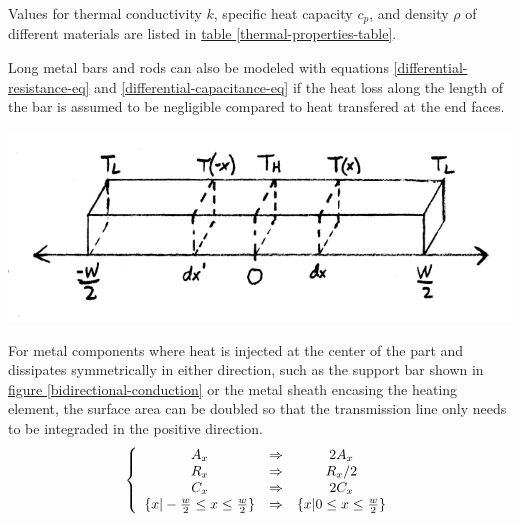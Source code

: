 \documentclass[10pt, twocolumn]{article}
\begin{document}
Values for thermal conductivity $k$, specific heat capacity $c_{p}$, and 
density $\rho$ of different materials are listed in
\hyperref[thermal-properties-table]{table \ref{thermal-properties-table}}.

Long metal bars and rods can also be modeled with equations
\ref{differential-resistance-eq} and \ref{differential-capacitance-eq}
if the heat loss along the length of the bar is assumed to be
negligible compared to heat transfered at the end faces.

\begin{center}
	\includegraphics[width=1\columnwidth]{Figures/bidirectional-conduction.pdf}
	\label{bidirectional-conduction}
\end{center}

For metal components where heat is injected at the center
of the part and dissipates symmetrically in either direction,
such as the support bar shown in
\hyperref[bidirectional-conduction]{figure \ref{bidirectional-conduction}}
or the metal sheath encasing the heating element,
the surface area can be doubled so that the transmission line
only needs to be integraded in the positive direction.
\begin{equation}
\left\{\begin{array}{c c c}
A_{x}	&\Rightarrow	&2A_{x}	\\
R_{x}	&\Rightarrow	&R_{x}/{2}	\\
C_{x}	&\Rightarrow	&2C_{x}	\\
\{x|-\frac{w}{2} \leq x \leq \frac{w}{2}\}	&\Rightarrow	&\{x|0 \leq x \leq \frac{w}{2}\}	\\
\end{array}\right.
\end{equation}
\end{document}
